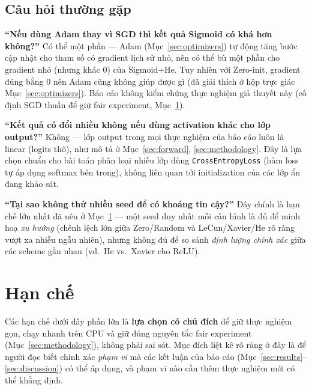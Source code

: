 \documentclass[12pt,a4paper]{article}
\begin{document}
\subsection{Câu hỏi thường gặp}

\textbf{``Nếu dùng Adam thay vì SGD thì kết quả Sigmoid có khá hơn
không?''} Có thể một phần --- Adam (Mục~\ref{sec:optimizers}) tự động
tăng bước cập nhật cho tham số có gradient lịch sử nhỏ, nên có thể bù một
phần cho gradient nhỏ (nhưng khác $0$) của Sigmoid+He. Tuy nhiên với
Zero-init, gradient đúng bằng $0$ nên Adam cũng không giúp được gì (đã
giải thích ở hộp trực giác Mục~\ref{sec:optimizers}). Báo cáo không kiểm
chứng thực nghiệm giả thuyết này (cố định SGD thuần để giữ fair
experiment, Mục~\ref{sec:limitations}).

\textbf{``Kết quả có đổi nhiều không nếu dùng activation khác cho lớp
output?''} Không --- lớp output trong mọi thực nghiệm của báo cáo luôn là
linear (logits thô), như mô tả ở Mục~\ref{sec:forward},
\ref{sec:methodology}. Đây là lựa chọn chuẩn cho bài toán phân loại nhiều
lớp dùng \texttt{CrossEntropyLoss} (hàm loss tự áp dụng softmax bên
trong), không liên quan tới initialization của các lớp ẩn đang khảo sát.

\textbf{``Tại sao không thử nhiều seed để có khoảng tin cậy?''} Đây chính
là hạn chế lớn nhất đã nêu ở Mục~\ref{sec:limitations} --- một seed duy
nhất mỗi cấu hình là đủ để minh hoạ \emph{xu hướng} (chênh lệch lớn giữa
Zero/Random và LeCun/Xavier/He rõ ràng vượt xa nhiễu ngẫu nhiên), nhưng
không đủ để so sánh \emph{định lượng chính xác} giữa các scheme gần nhau
(vd.\ He vs.\ Xavier cho ReLU).

\section{Hạn chế}
\label{sec:limitations}

Các hạn chế dưới đây phần lớn là \textbf{lựa chọn có chủ đích} để giữ thực
nghiệm gọn, chạy nhanh trên CPU và giữ đúng nguyên tắc fair experiment
(Mục~\ref{sec:methodology}), không phải sai sót. Mục đích liệt kê rõ ràng
ở đây là để người đọc biết chính xác \emph{phạm vi} mà các kết luận của
báo cáo (Mục~\ref{sec:results}--\ref{sec:discussion}) có thể áp dụng, và
phạm vi nào cần thêm thực nghiệm mới có thể khẳng định.
\end{document}
